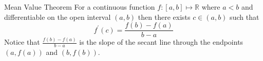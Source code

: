 \documentclass[preview]{standalone}
\begin{document}
\begin{theo*}{Mean Value Theorem}
  For a continuous function $f: \left[ a,b \right] \mapsto \mathbb{R} $ where $a < b$ and differentiable on the open interval $ \left( a, b \right)$ then there exists $c \in \left( a, b \right)$ such that 
  \[
  f ^{\prime}\left(c\right) = \frac{f\left(b\right)  -  f\left(a\right)}{b  -  a}
  \]
  Notice that  $ \frac{f\left(b\right)  -  f\left(a\right)}{b  -  a}$ is the slope of the secant line through the endpoints $ \left(  a, f\left(a\right) \right)$ and $ \left( b, f\left(b\right) \right)$.
\end{theo*}
\end{document}
